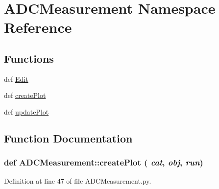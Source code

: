 \hypertarget{namespaceADCMeasurement}{
\section{ADCMeasurement Namespace Reference}
\label{namespaceADCMeasurement}
}
\subsection*{Functions}
\begin{DoxyCompactItemize}
\item 
def \hyperlink{namespaceADCMeasurement_a201fc534845b6f266457f888b7544a42}{Edit}
\item 
def \hyperlink{namespaceADCMeasurement_acb07f4f2b43333a8ed4c95bf33d6a4b0}{createPlot}
\item 
def \hyperlink{namespaceADCMeasurement_a711a07185db6732546b49e91a07bfc3f}{updatePlot}
\end{DoxyCompactItemize}


\subsection{Function Documentation}
\hypertarget{namespaceADCMeasurement_acb07f4f2b43333a8ed4c95bf33d6a4b0}{
\subsubsection[{createPlot}]{\setlength{\rightskip}{0pt plus 5cm}def ADCMeasurement::createPlot ( {\em cat}, \/   {\em obj}, \/   {\em run})}}
\label{namespaceADCMeasurement_acb07f4f2b43333a8ed4c95bf33d6a4b0}


Definition at line 47 of file ADCMeasurement.py.


